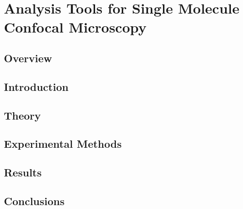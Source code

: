 \chapter{Analysis Tools for Single Molecule Confocal Microscopy}
\section{Overview}
\section{Introduction}
\section{Theory}
\section{Experimental Methods}
\section{Results}
\section{Conclusions}